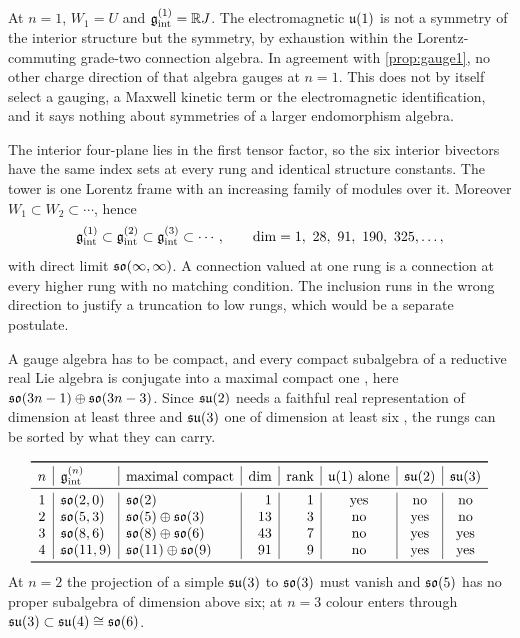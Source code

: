 \begin{corollary}
\label{cor:photon1}
At $n=1$, $W_1=U$ and $\mathfrak g_{\rm int}^{(1)}=\mathbb{R} J$. The electromagnetic $\mathfrak{u}(1)$ is not a symmetry of the interior structure but the
symmetry, by exhaustion within the Lorentz-commuting grade-two connection algebra. In agreement with \cref{prop:gauge1}, no other charge
direction of that algebra gauges at $n=1$. This does not by itself select a gauging, a Maxwell kinetic term or the electromagnetic
identification, and it says nothing about symmetries of a larger endomorphism algebra.
\end{corollary}

\begin{proposition}
\label{prop:frame}
The interior four-plane lies in the first tensor factor, so the six interior bivectors have the same index sets at every rung and
identical structure constants. The tower is one Lorentz frame with an increasing family of modules over it. Moreover
$W_1\subset W_2\subset\cdots$, hence
\[
\mathfrak g_{\rm int}^{(1)}\subset\mathfrak g_{\rm int}^{(2)}\subset\mathfrak g_{\rm int}^{(3)}\subset\cdots,\qquad \dim=1,\ 28,\ 91,\ 190,\ 325,\dots,
\]
with direct limit $\mathfrak{so}(\infty,\infty)$. A connection valued at one rung is a connection at every higher rung with no matching
condition. The inclusion runs in the wrong direction to justify a truncation to low rungs, which would be a separate postulate.
\end{proposition}

A gauge algebra has to be compact, and every compact subalgebra of a reductive real Lie algebra is conjugate into a maximal compact
one \cite{Knapp,Helgason}, here $\mathfrak{so}(3n-1)\oplus\mathfrak{so}(3n-3)$. Since $\mathfrak{su}(2)$ needs a faithful real representation of dimension at least
three and $\mathfrak{su}(3)$ one of dimension at least six \cite{GoodmanWallach}, the rungs can be sorted by what they can carry.

\begin{theorem}
\label{thm:census}
\[
\begin{array}{c|l|l|r|r|c|c|c}
\toprule
n & \gint^{(n)} & \text{maximal compact} & \dim & \text{rank} & \uu1\ \text{alone} & \su2 & \su3\\
\midrule
1 & \so{2,0} & \so2 & 1 & 1 & \text{yes} & \text{no} & \text{no}\\
2 & \so{5,3} & \so5\oplus\so3 & 13 & 3 & \text{no} & \text{yes} & \text{no}\\
3 & \so{8,6} & \so8\oplus\so6 & 43 & 7 & \text{no} & \text{yes} & \text{yes}\\
4 & \so{11,9} & \so{11}\oplus\so9 & 91 & 9 & \text{no} & \text{yes} & \text{yes}\\
\bottomrule
\end{array}
\]
At $n=2$ the projection of a simple $\mathfrak{su}(3)$ to $\mathfrak{so}(3)$ must vanish and $\mathfrak{so}(5)$ has no proper subalgebra of dimension above six; at
$n=3$ colour enters through $\mathfrak{su}(3)\subset\mathfrak{su}(4)\cong\mathfrak{so}(6)$.
\end{theorem}

